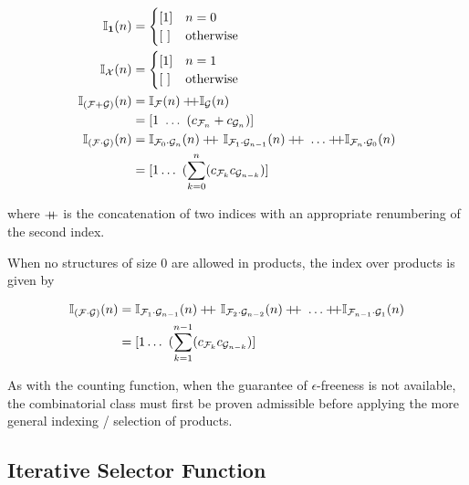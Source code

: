 \begin{equation}
\begin{aligned}
\combdex{\specI}(n)   & =  \begin{cases} [1] & n = 0  \\  [\ ] & \text{otherwise}   \end{cases} \\
\combdex{\specX}(n)   & =  \begin{cases} [1] & n = 1  \\  [\ ] & \text{otherwise}   \end{cases} \\
\combdex{(\specF \splus \specG)}(n) & =  \combdex{\specF}(n) \concat  \combdex{\specG}(n) \\
     & =  [1\ \ldots\ (c_{\specn{F}{n}} + c_{\specn{G}{n}})] \\
\combdex{(\specF \sprod \specG)}(n)   
    & = \combdex{\specn{F}{0} \sprod \specn{G}{n}}(n) \concat\ \combdex{\specn{F}{1} \sprod \specn{G}{n-1}}(n) \concat\
            \ldots \concat \combdex{\specn{F}{n} \sprod \specn{G}{0}}(n) \\
    & = [1 \ldots\ (\sum_{k=0}^{n} (c_{\specn{F}{k}} c_{\specn{G}{n-k}}) ]
\end{aligned}
\end{equation}

\noindent where $+\!\!\!+$ is the concatenation of two indices
with an appropriate renumbering of the second index.

\noindent
When no structures of size 0 are allowed in products,
the index over products is given by

\begin{equation}
\begin{aligned}
\combdex{(\specF \sprod \specG)}(n)   
    & = \combdex{\specn{F}{1} \sprod \specn{G}{n-1}}(n) \concat\ \combdex{\specn{F}{2} \sprod \specn{G}{n-2}}(n) \concat\
            \ldots \concat \combdex{\specn{F}{n-1} \sprod \specn{G}{1}}(n) \\
    & = [1 \ldots\ (\sum_{k=1}^{n-1} (c_{\specn{F}{k}} c_{\specn{G}{n-k}}) ]
\end{aligned}
\end{equation}

\noindent
As with the counting function,
when the guarantee of $\epsilon$-freeness is not available,
the combinatorial class must first be proven admissible before 
applying the more general indexing / selection of products.

\subsection{Iterative Selector Function}

